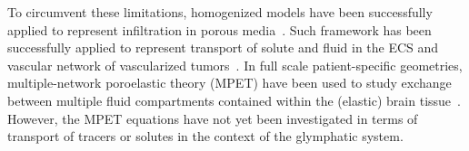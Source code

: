 \documentclass[10pt]{article}
\newcommand{\ie}{\emph{i.e.}\;}
\newcommand{\eg}{\emph{e.g.}\;}
\newcommand{\1}{^{(1)}}
\newcommand{\2}{^{(2)}}
\begin{document}
To circumvent these limitations, homogenized models have been successfully applied to represent infiltration in porous media~\cite{Hornung-1996-homogenization}. Such framework has been successfully applied to represent transport of solute and fluid in the ECS and vascular network of vascularized tumors~\cite{ shipley_multiscale_2010,shipley-four-comp, Penta-homogenization-2015}.   
In full scale patient-specific geometries, multiple-network poroelastic theory (MPET) have been used to study exchange between multiple fluid compartments contained within the (elastic) brain tissue~\cite{Biot-1941-Consolidation,Biot-1955-Consolidation2, Bai-MPET-1993,tully_ventikos_2011,Vardakis-2016-cerebral,Guo-2018-MPET,Guo-2019-MPET}. However, the MPET equations have not yet been investigated in terms of transport of tracers or solutes in the context of the glymphatic system.


\end{document}
